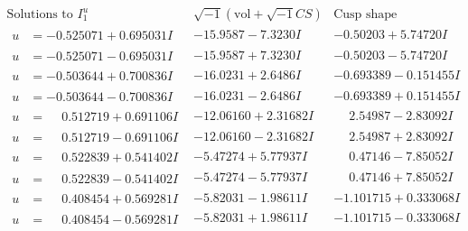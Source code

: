 \documentclass[1p]{elsarticle_modified}
\theoremstyle{definition}
\newcommand{\I}{\sqrt{-1}}
\begin{document}
$$\begin{array}{c|c|c}  
\text{Solutions to }I^u_{1}& \I (\text{vol} + \sqrt{-1}CS) & \text{Cusp shape}\\
 \hline 
\begin{aligned}
u &= -0.525071 + 0.695031 I\end{aligned}
 & -15.9587 - 7.3230 I & -0.50203 + 5.74720 I \\ \hline\begin{aligned}
u &= -0.525071 - 0.695031 I\end{aligned}
 & -15.9587 + 7.3230 I & -0.50203 - 5.74720 I \\ \hline\begin{aligned}
u &= -0.503644 + 0.700836 I\end{aligned}
 & -16.0231 + 2.6486 I & -0.693389 - 0.151455 I \\ \hline\begin{aligned}
u &= -0.503644 - 0.700836 I\end{aligned}
 & -16.0231 - 2.6486 I & -0.693389 + 0.151455 I \\ \hline\begin{aligned}
u &= \phantom{-}0.512719 + 0.691106 I\end{aligned}
 & -12.06160 + 2.31682 I & \phantom{-}2.54987 - 2.83092 I \\ \hline\begin{aligned}
u &= \phantom{-}0.512719 - 0.691106 I\end{aligned}
 & -12.06160 - 2.31682 I & \phantom{-}2.54987 + 2.83092 I \\ \hline\begin{aligned}
u &= \phantom{-}0.522839 + 0.541402 I\end{aligned}
 & -5.47274 + 5.77937 I & \phantom{-}0.47146 - 7.85052 I \\ \hline\begin{aligned}
u &= \phantom{-}0.522839 - 0.541402 I\end{aligned}
 & -5.47274 - 5.77937 I & \phantom{-}0.47146 + 7.85052 I \\ \hline\begin{aligned}
u &= \phantom{-}0.408454 + 0.569281 I\end{aligned}
 & -5.82031 - 1.98611 I & -1.101715 + 0.333068 I \\ \hline\begin{aligned}
u &= \phantom{-}0.408454 - 0.569281 I\end{aligned}
 & -5.82031 + 1.98611 I & -1.101715 - 0.333068 I \\ \hline\begin{aligned}

\end{aligned}
\end{array}$$
\end{document}
